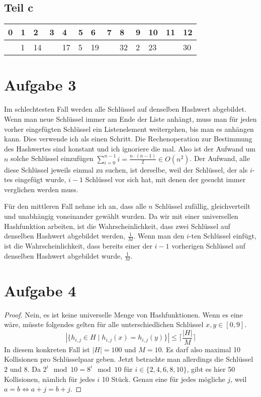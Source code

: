 \documentclass[10pt,a4paper]{article}
\begin{document}
\subsection{Teil c}
\begin{tabular}{l|l|l|l|l|l|l|l|l|l|l|l|l}
  0 & 1 & 2 & 3 & 4 & 5 & 6 & 7 & 8 & 9 & 10 & 11 & 12\\
  \hline
    & 1 & 14 &   & 17 & 5 & 19 &   & 32 & 2 & 23 &  & 30
\end{tabular}

\section{Aufgabe 3}
Im schlechtesten Fall werden alle Schlüssel auf denselben Hashwert abgebildet.
Wenn man neue Schlüssel immer am Ende der Liste anhängt, muss man für jeden vorher eingefügten Schlüssel ein Listenelement weitergehen, bis man es anhängen kann.
Dies verwende ich als einen Schritt.
Die Rechenoperation zur Bestimmung des Hashwertes sind konstant und ich ignoriere die mal.
Also ist der Aufwand um $n$ solche Schlüssel einzufügen $\sum_{i = 0}^{n - 1} i = \frac{n \cdot (n - 1)}{2} \in O(n^{2})$.
Der Aufwand, alle diese Schlüssel jeweils einmal zu suchen, ist derselbe, weil der Schlüssel, der als $i$-tes eingefügt wurde, $i - 1$ Schlüssel vor sich hat, mit denen der gesucht immer verglichen werden muss.

Für den mittleren Fall nehme ich an, dass alle $n$ Schlüssel zufällig, gleichverteilt und unabhängig voneinander gewählt wurden.
Da wir mit einer universellen Hashfunktion arbeiten, ist die Wahrscheinlichkeit, dass zwei Schlüssel auf denselben Hashwert abgebildet werden, $\frac{1}{M}$.
Wenn man den $i$-ten Schlüssel einfügt, ist die Wahrscheinlichkeit, dass bereits einer der $i - 1$ vorherigen Schlüssel auf denselben Hashwert abgebildet wurde, $\frac{1}{M}$.


\section{Aufgabe 4}
\begin{proof}
  Nein, es ist keine universelle Menge von Hashfunktionen.
  Wenn es eine wäre, müsste folgendes gelten für alle unterschiedlichen Schlüssel $x, y \in [0, 9]$.
  \begin{equation}
    |\{ h_{i,j} \in H \mid h_{i,j}(x) = h_{i,j}(y) \}| \le \lceil \frac{|H|}{M} \rceil
  \end{equation}
  In diesem konkreten Fall ist $|H| = 100$ und $M = 10$.
  Es darf also maximal 10 Kollisionen pro Schlüsselpaar geben.
  Jetzt betrachte man allerdings die Schlüssel $2$ und $8$.
  Da $2^{i} \mod 10 = 8^{i} \mod 10$ für $i \in \{ 2, 4, 6, 8, 10 \}$, gibt es hier 50 Kollisionen, nämlich für jedes $i$ 10 Stück.
  Genau eine für jedes mögliche $j$, weil $a = b \Leftrightarrow a + j = b + j$.
\end{proof}
\end{document}
